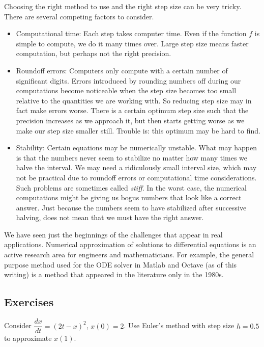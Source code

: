Choosing the right method to use and the right step size can be very tricky.
There are several competing factors to consider.
\begin{itemize}
\item Computational time:  Each step takes computer time.  Even if the
function $f$ is simple to compute, we do it many times over.
Large step size means faster computation, but perhaps not
the right precision.
\item Roundoff errors: Computers only compute with a certain number of
significant digits.  Errors introduced by rounding numbers off during our
computations become noticeable when the step size becomes
too small relative to the quantities we are working with.
So reducing
step size may in fact make errors worse.
There is a certain optimum step size
such that the precision increases as we approach it, but then starts getting
worse as we make our step size
smaller still.  Trouble is: this optimum may be hard to find.
\item Stability: Certain equations may be numerically unstable.  What may
happen is that the numbers never seem to stabilize no matter how many times
we halve the interval.  We may need a ridiculously small interval size,
which may not be practical due to roundoff errors or computational time
considerations.  Such problems are sometimes called
\emph{stiff}.
In the worst case, the numerical computations might be
giving us bogus numbers that look like a correct answer.  Just because the
numbers seem to have stabilized after successive halving, does not mean that we must
have the right answer.
\end{itemize}

We have seen just the beginnings of the challenges that appear in real
applications.  Numerical approximation of solutions to differential
equations is an active research area for engineers and mathematicians.  For
example, the general purpose method used for the ODE solver in Matlab and
Octave (as of this writing) is a method that appeared in the literature only
in the 1980s.

\subsection{Exercises}

\begin{exercise}
Consider $\dfrac{dx}{dt} = {(2t-x)}^2$, $x(0)=2$.  Use Euler's method
with step size $h=0.5$ to approximate $x(1)$.
\end{exercise}

